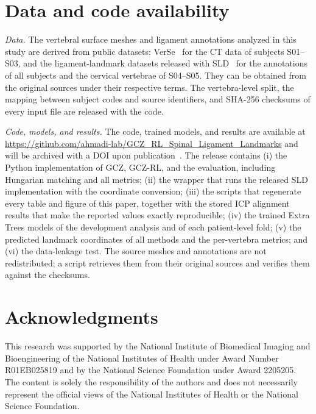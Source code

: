 \documentclass[5p,times,twocolumn,authoryear]{elsarticle}
\begin{document}
\section*{Data and code availability}
\textit{Data.} The vertebral surface meshes and ligament annotations analyzed in this study are derived from public datasets: VerSe~\citep{sekuboyina2021} for the CT data of subjects S01--S03, and the ligament-landmark datasets released with SLD~\citep{blomenkamp2026sld,spinetoolkit2026} for the annotations of all subjects and the cervical vertebrae of S04--S05. They can be obtained from the original sources under their respective terms. The vertebra-level split, the mapping between subject codes and source identifiers, and SHA-256 checksums of every input file are released with the code.

\textit{Code, models, and results.} The code, trained models, and results are available at \url{https://github.com/ahmadi-lab/GCZ_RL_Spinal_Ligament_Landmarks} and will be archived with a DOI upon publication~\citep{gczrl2026code}. The release contains (i) the Python implementation of GCZ, GCZ-RL, and the evaluation, including Hungarian matching and all metrics; (ii) the wrapper that runs the released SLD implementation with the coordinate conversion; (iii) the scripts that regenerate every table and figure of this paper, together with the stored ICP alignment results that make the reported values exactly reproducible; (iv) the trained Extra Trees models of the development analysis and of each patient-level fold; (v) the predicted landmark coordinates of all methods and the per-vertebra metrics; and (vi) the data-leakage test. The source meshes and annotations are not redistributed; a script retrieves them from their original sources and verifies them against the checksums.

\section*{Acknowledgments}
This research was supported by the National Institute of Biomedical Imaging and Bioengineering of the National Institutes of Health under Award Number R01EB025819 and by the National Science Foundation under Award 2205205. The content is solely the responsibility of the authors and does not necessarily represent the official views of the National Institutes of Health or the National Science Foundation.



\end{document}
